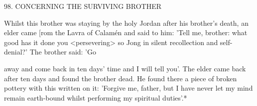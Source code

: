 98.
CONCERNING THE SURVIVING BROTHER

Whilst this brother was staying by the holy Jordan after his
brother's death, an elder came [rom the Lavra of Calamén and said
to him: 'Tell me, brother: what good has it done you <persevering>
so Jong in silent recollection and self-denial?' The brother said: 'Go

away and come back in ten days' time and I will tell you'.
The elder
came back after ten days and found the brother dead.
He found
there a piece of broken pottery with this written on it: 'Forgive me,
father, but I have never let my mind remain earth-bound whilst
performing my spiritual duties'.*

